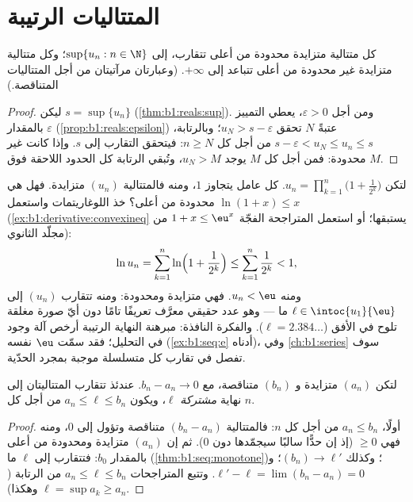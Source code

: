 \section{المتتاليات الرتيبة}

\begin{theorem}\label{thm:b1:seq:monotone}
كل متتالية متزايدة محدودة من أعلى تتقارب، إلى $\sup\{u_n : n \in
\N\}$؛ وكل متتالية متزايدة غير محدودة من أعلى تتباعد إلى
$+\infty$. (وعبارتان مرآتيتان من أجل المتتاليات
المتناقصة.)
\end{theorem}

\begin{proof}
ليكن $s = \sup\{u_n\}$ (\cref{thm:b1:reals:sup}). ومن أجل $\varepsilon >
0$، يعطي التمييز بالمقدار $\varepsilon$
(\cref{prop:b1:reals:epsilon}) عتبةً $N$ تحقق $u_N > s -
\varepsilon$؛ وبالرتابة، $s - \varepsilon < u_N \leq u_n \leq
s$ من أجل كل $n \geq N$: فيتحقق التقارب إلى $s$. وإذا كانت غير محدودة: فمن أجل كل
$M$ يوجد $u_N > M$، وتُبقي الرتابة كل الحدود اللاحقة فوق $M$.
\end{proof}

\begin{example}\label{ex:b1:seq:existencemachine}
لتكن $u_n = \prod_{k=1}^{n} \bigl(1 + \frac{1}{2^k}\bigr)$. كل
عامل يتجاوز $1$، ومنه فالمتتالية $(u_n)$ متزايدة. فهل هي محدودة من أعلى؟ خذ
اللوغاريتمات واستعمل $\ln(1 + x) \leq x$
(\cref{ex:b1:derivative:convexineq} يستبقها؛ أو استعمل
المتراجحة الفجّة $1 + x \leq \eu^x$ من مجلّد الثانوي):
\[
\ln u_n = \sum_{k=1}^{n} \ln\Bigl(1 + \frac{1}{2^k}\Bigr)
\leq \sum_{k=1}^{n} \frac{1}{2^k} < 1 ,
\]
ومنه $u_n < \eu$. فهي متزايدة ومحدودة: ومنه تتقارب $(u_n)$ إلى
$\ell \in \intoc{u_1}{\eu}$ ما --- وهو عدد حقيقي معرَّف تعريفًا تامًا
دون أيّ صورة مغلقة تلوح في الأفق ($\ell = 2.384\dots$). والفكرة
النافذة: مبرهنة النهاية الرتيبة أرخص آلة وجود
في التحليل؛ فقد سمّت $\eu$ نفسه
(\cref{ex:b1:seq:e} أدناه)، وفي \cref{ch:b1:series} سوف
تفصل في تقارب كل متسلسلة موجبة بمجرد
الحدّية.
\end{example}

\begin{theorem}\label{thm:b1:seq:adjacent}
لتكن $(a_n)$ متزايدة و $(b_n)$ متناقصة، مع $b_n - a_n \to
0$. عندئذ تتقارب المتتاليتان إلى نهاية \emph{مشتركة} $\ell$، ويكون $a_n
\leq \ell \leq b_n$ من أجل كل $n$.
\end{theorem}

\begin{proof}
أولًا، $a_n \leq b_n$ من أجل كل $n$: فالمتتالية $(b_n - a_n)$
متناقصة وتؤول إلى $0$، ومنه فهي $\geq 0$ (إذ إن حدًّا سالبًا سيجمّدها
دون $0$). ثم إن $(a_n)$ متزايدة ومحدودة من أعلى بالمقدار
$b_0$: فتتقارب إلى $\ell$ ما (\cref{thm:b1:seq:monotone})؛
وكذلك $(b_n) \to \ell'$؛ و $\ell' - \ell = \lim (b_n - a_n) =
0$. وتتبع المتراجحات $a_n \leq \ell \leq b_n$ من
الرتابة ($\ell = \sup a_k \geq a_n$ وهكذا).
\end{proof}

